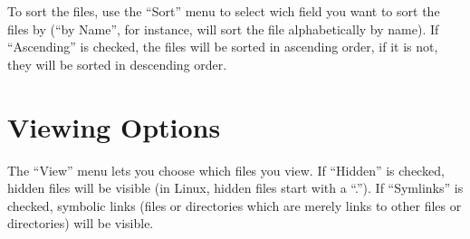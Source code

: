 \documentclass[12pt,letterpaper,oneside, openany]{book} \usepackage[latin1] {inputenc}
\begin{document}
To sort the files, use the ``Sort'' menu to select wich field you want to sort the files by (``by Name'', for instance, will sort the file alphabetically by name). If ``Ascending'' is checked, the files will be sorted in ascending order, if it is not, they will be sorted in descending order. 

\section{Viewing Options}

The ``View'' menu lets you choose which files you view. If ``Hidden'' is checked, hidden files will be visible (in Linux, hidden files start with a ``.''). If ``Symlinks'' is checked, symbolic links (files or directories which are merely links to other files or directories) will be visible.
\end{document}
